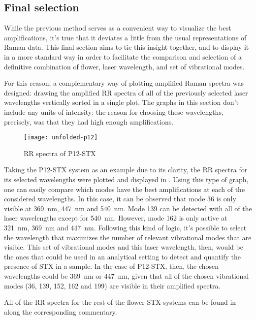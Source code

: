 \subsection{Final selection}
While the previous method serves as a convenient way to visualize the best amplifications, it's true that it deviates a little from the usual representations of Raman data.
This final section aims to tie this insight together, and to display it in a more standard way in order to facilitate the comparison and selection of a definitive combination of flower, laser wavelength, and set of vibrational modes.

For this reason, a complementary way of plotting amplified Raman spectra was designed: drawing the amplified RR spectra of all of the previously selected laser wavelengths vertically sorted in a single plot.
The graphs in this section don't include any units of intensity: the reason for choosing these wavelengths, precisely, was that they had high enough amplifications.

\begin{figure*}[h]
    \texttt{[image: unfolded-p12]}
    \caption[RR spectra of P12-STX]{RR spectra of P12-STX}
\end{figure*}

Taking the P12-STX system as an example due to its clarity, the RR spectra for its selected wavelengths were plotted and displayed in .
Using this type of graph, one can easily compare which modes have the best amplifications at each of the considered wavelengths.
In this case, it can be observed that mode 36 is only visible at \SI{369}{\nano\metre}, \SI{447}{\nano\metre} and \SI{540}{\nano\metre}.
Mode 139 can be detected with all of the laser wavelengths except for \SI{540}{\nano\metre}.
However, mode 162 is only active at \SI{321}{\nano\metre}, \SI{369}{\nano\metre} and \SI{447}{\nano\metre}.
Following this kind of logic, it's possible to select the wavelength that maximizes the number of relevant vibrational modes that are visible.
This set of vibrational modes and this laser wavelength, then, would be the ones that could be used in an analytical setting to detect and quantify the presence of STX in a sample.
In the case of P12-STX, then, the chosen wavelengths could be \SI{369}{\nano\meter} or \SI{447}{\nano\meter}, given that all of the chosen vibrational modes (\num{36}, \num{139}, \num{152}, \num{162} and \num{199}) are visible in their amplified spectra.

All of the RR spectra for the rest of the flower-STX systems can be found in  along the corresponding commentary.

